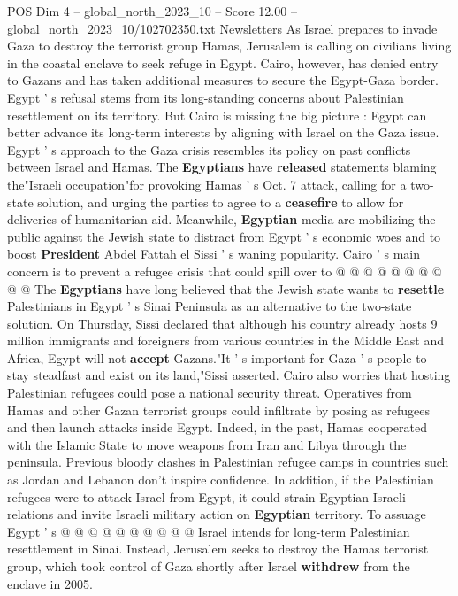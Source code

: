 \begin{textsample}{POS Dim 4 – global\_north\_2023\_10 – Score 12.00 – global\_north\_2023\_10/102702350.txt}  \label{ex:f4_pos_450}
Newsletters As Israel prepares to invade Gaza to destroy the terrorist group Hamas, Jerusalem is calling on civilians living in the coastal enclave to seek refuge in Egypt.
Cairo, however, has denied entry to Gazans and has taken additional measures to secure the Egypt-Gaza border.
Egypt ' s refusal stems from its long-standing concerns about Palestinian resettlement on its territory.
But Cairo is missing the big picture : Egypt can better advance its long-term interests by aligning with Israel on the Gaza issue.
Egypt ' s approach to the Gaza crisis resembles its policy on past conflicts between Israel and Hamas.
The \textbf{Egyptians} have \textbf{released} statements blaming the"Israeli occupation"for provoking Hamas ' s Oct. 7 attack, calling for a two-state solution, and urging the parties to agree to a \textbf{ceasefire} to allow for deliveries of humanitarian aid.
Meanwhile, \textbf{Egyptian} media are mobilizing the public against the Jewish state to distract from Egypt ' s economic woes and to boost \textbf{President} Abdel Fattah el Sissi ' s waning popularity.
Cairo ' s main concern is to prevent a refugee crisis that could spill over to @ @ @ @ @ @ @ @ @ @ The \textbf{Egyptians} have long believed that the Jewish state wants to \textbf{resettle} Palestinians in Egypt ' s Sinai Peninsula as an alternative to the two-state solution.
On Thursday, Sissi declared that although his country already hosts 9 million immigrants and foreigners from various countries in the Middle East and Africa, Egypt will not \textbf{accept} Gazans."It ' s important for Gaza ' s people to stay steadfast and exist on its land,"Sissi asserted.
Cairo also worries that hosting Palestinian refugees could pose a national security threat.
Operatives from Hamas and other Gazan terrorist groups could infiltrate by posing as refugees and then launch attacks inside Egypt.
Indeed, in the past, Hamas cooperated with the Islamic State to move weapons from Iran and Libya through the peninsula.
Previous bloody clashes in Palestinian refugee camps in countries such as Jordan and Lebanon don't inspire confidence.
In addition, if the Palestinian refugees were to attack Israel from Egypt, it could strain Egyptian-Israeli relations and invite Israeli military action on \textbf{Egyptian} territory.
To assuage Egypt ' s @ @ @ @ @ @ @ @ @ @ Israel intends for long-term Palestinian resettlement in Sinai.
Instead, Jerusalem seeks to destroy the Hamas terrorist group, which took control of Gaza shortly after Israel \textbf{withdrew} from the enclave in 2005.

\end{textsample}

